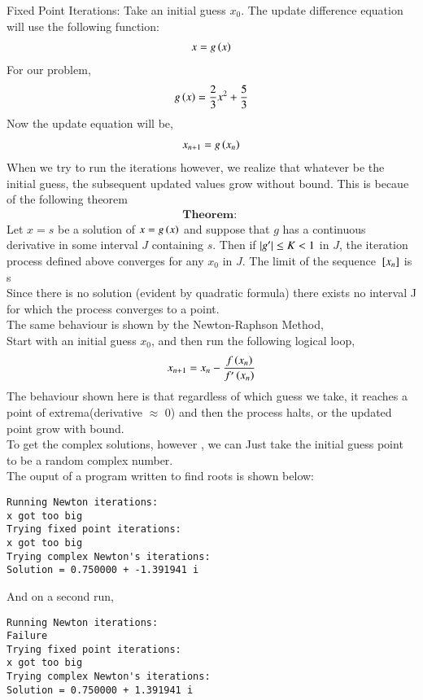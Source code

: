 \documentclass[journal]{IEEEtran}
\begin{document}
Fixed Point Iterations:
Take an initial guess $x_0$. The update difference equation will use the following function:
\begin{align}
    x = g\left(x\right)
\end{align}
For our problem,
\begin{align}
    g\left(x\right) = \frac{2}{3}x^2 + \frac{5}{3}
\end{align}
Now the update equation will be,
\begin{align}
    x_{n+1} = g\left(x_n\right) 
\end{align}
When we try to run the iterations however, we realize that whatever be the initial guess, 
the subsequent updated values grow without bound. This is becaue of the following theorem\\
\begin{align}
    \textbf{Theorem: }
\end{align}
    Let $x = s$ be a solution of $x = g\left(x\right)$ and suppose that $g$ has a continuous
    derivative in some interval $J$ containing $s$. Then if $\left\vert g^{\prime}\right\vert \le K < 1$ in $J$,
    the iteration process defined  above converges for any $x_0$ in $J$. The limit of the sequence
    ${}\left[x_n\right]$ is s\\
\newline
Since there is no solution (evident by quadratic formula) there exists no interval J for which
the process converges to a point.\\
\newline
The same behaviour is shown by the Newton-Raphson Method,\\
Start with an initial guess $x_0$, and then run the following logical loop,
\begin{align}
    x_{n+1} = x_n - \frac{f\left(x_n\right)}{f^{\prime}\left(x_n\right)} 
\end{align}
The behaviour shown here is that regardless of which guess we take, it reaches a point of 
extrema(derivative $\approx$ 0) and then the process halts, or the updated point grow with bound.\\
To get the complex solutions, however , we can Just take the initial guess point to be a 
random complex number.\\
The ouput of a program written to find roots is shown below:
\begin{verbatim}
Running Newton iterations:
x got too big
Trying fixed point iterations:
x got too big
Trying complex Newton's iterations:
Solution = 0.750000 + -1.391941 i
\end{verbatim}
And on a second run, 
\begin{verbatim}
Running Newton iterations:
Failure
Trying fixed point iterations:
x got too big
Trying complex Newton's iterations:
Solution = 0.750000 + 1.391941 i
\end{verbatim}
\end{document}

